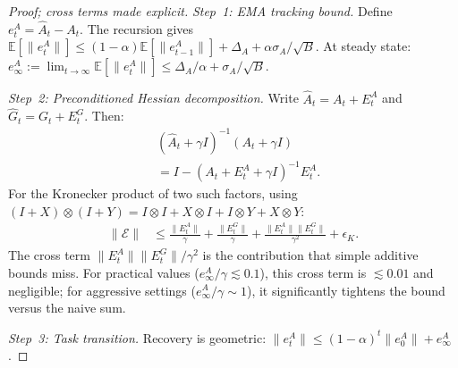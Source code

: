 \documentclass{article}
\providecommand{\E}{\mathbb{E}}
\providecommand{\norm}[1]{\lVert #1 \rVert}
\theoremstyle{plain}
\theoremstyle{definition}
\theoremstyle{remark}
\begin{document}
\begin{proof}[Proof; cross terms made explicit]
\emph{Step~1: EMA tracking bound.} Define $e_t^A = \hat{A}_t - A_t$. The recursion gives $\E[\norm{e_t^A}] \leq (1-\alpha)\E[\norm{e_{t-1}^A}] + \Delta_A + \alpha\sigma_A/\sqrt{B}$. At steady state: $e_\infty^A := \lim_{t\to\infty}\E[\norm{e_t^A}] \leq \Delta_A/\alpha + \sigma_A/\sqrt{B}$.

\emph{Step~2: Preconditioned Hessian decomposition.} Write $\hat{A}_t = A_t + E_t^A$ and $\hat{G}_t = G_t + E_t^G$. Then:
\begin{align}
    &(\hat{A}_t \!+\! \gamma I)^{-1}(A_t \!+\! \gamma I) \nonumber \\
    &= I - (A_t \!+\! E_t^A \!+\! \gamma I)^{-1}E_t^A.
\end{align}
For the Kronecker product of two such factors, using $(I+X) \otimes (I+Y) = I \otimes I + X \otimes I + I \otimes Y + X \otimes Y$:
\begin{align}
    \norm{\mathcal{E}} &\leq \frac{\norm{E_t^A}}{\gamma} + \frac{\norm{E_t^G}}{\gamma} + \frac{\norm{E_t^A}\norm{E_t^G}}{\gamma^2} + \epsilon_K.
\end{align}
The cross term $\norm{E_t^A}\norm{E_t^G}/\gamma^2$ is the contribution that simple additive bounds miss. For practical values ($e_\infty^A/\gamma \lesssim 0.1$), this cross term is $\lesssim 0.01$ and negligible; for aggressive settings ($e_\infty^A/\gamma \sim 1$), it significantly tightens the bound versus the naive sum.

\emph{Step~3: Task transition.} Recovery is geometric: $\norm{e_t^A} \leq (1-\alpha)^t\norm{e_0^A} + e_\infty^A$.
\end{proof}
\end{document}
